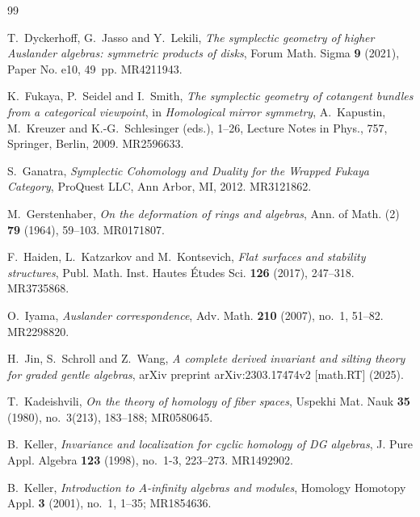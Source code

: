 \documentclass[a4paper, reqno, 11pt]{amsart}
\theoremstyle{definition}
\begin{document}
\begin{thebibliography}{99}
	
	
	
	T.~Dyckerhoff, G.~Jasso and Y.~Lekili,
	\emph{The symplectic geometry of higher Auslander algebras: symmetric products of disks},
	Forum Math. Sigma \textbf{9} (2021), Paper No. e10, 49~pp.
	MR4211943.
	
	K.~Fukaya, P.~Seidel and I.~Smith,
	\emph{The symplectic geometry of cotangent bundles from a categorical viewpoint},
	in {\it Homological mirror symmetry},
	A.~Kapustin, M.~Kreuzer and K.-G.~Schlesinger (eds.),
	1--26, Lecture Notes in Phys., 757, Springer, Berlin, 2009.
	MR2596633.
	
	S.~Ganatra,
	\emph{Symplectic Cohomology and Duality for the Wrapped Fukaya Category},
	ProQuest LLC, Ann Arbor, MI, 2012. MR3121862.
	
	M.~Gerstenhaber,
	\emph{On the deformation of rings and algebras},
	Ann. of Math. (2) \textbf{79} (1964), 59--103. MR0171807. 
	
	F.~Haiden, L.~Katzarkov and M.~Kontsevich,
	\emph{Flat surfaces and stability structures},
	Publ. Math. Inst. Hautes \'Etudes Sci. \textbf{126} (2017), 247--318.
	MR3735868.
	
	O.~Iyama,
	\emph{Auslander correspondence},
	Adv. Math. \textbf{210} (2007), no.~1, 51--82. MR2298820.
	
	H.~Jin, S.~Schroll and Z.~Wang,
	\emph{A complete derived invariant and silting theory for graded gentle algebras},
	arXiv preprint arXiv:2303.17474v2 [math.RT] (2025).
	
	T.~Kadeishvili,
	\emph{On the theory of homology of fiber spaces},
	Uspekhi Mat. Nauk \textbf{35} (1980), no.~3(213), 183--188; MR0580645.
	
	
	B.~Keller,
	\emph{Invariance and localization for cyclic homology of DG algebras},
	J. Pure Appl. Algebra \textbf{123} (1998), no.~1-3, 223--273. MR1492902.
	
	B.~Keller,
	\emph{Introduction to $A$-infinity algebras and modules},
	Homology Homotopy Appl. \textbf{3} (2001), no.~1, 1--35; MR1854636.
	

\end{thebibliography}
\end{document}
